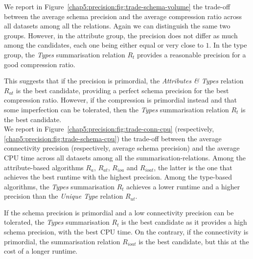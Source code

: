 We report in Figure~\ref{chap5:precision:fig:trade-schema-volume} the trade-off between the average schema precision and the average compression ratio across all datasets among all the relations. Again we can distinguish the same two groups. However, in the attribute group, the precision does not differ as much among the candidates, each one being either equal or very close to $1$. In the type group, the \emph{Types} summarisation relation $R_t$ provides a reasonable precision for a good compression ratio.

This suggests that if the precision is primordial, the \emph{Attributes \& Types} relation $R_{at}$ is the best candidate, providing a perfect schema precision for the best compression ratio. However, if the compression is primordial instead and that some imperfection can be tolerated, then the \emph{Types} summarisation relation $R_t$ is the best candidate.\\

We report in Figure~\ref{chap5:precision:fig:trade-conn-cpu} (respectively, \ref{chap5:precision:fig:trade-schema-cpu}) the trade-off between the average connectivity precision (respectively, average schema precision) and the average CPU time across all datasets among all the \glspl{summarisation-relation}. Among the attribute-based algorithms $R_a$, $R_{at}$, $R_{ioa}$ and $R_{ioat}$, the latter is the one that achieves the best runtime with the highest precision. Among the type-based algorithms, the \emph{Types} summarisation $R_t$ achieves a lower runtime and a higher precision than the \emph{Unique Type} relation $R_{ut}$.

If the schema precision is primordial and a low connectivity precision can be tolerated, the \emph{Types} summarisation $R_t$ is the best candidate as it provides a high schema precision, with the best CPU time. On the contrary, if the connectivity is primordial, the summarisation relation $R_{ioat}$ is the best candidate, but this at the cost of a longer runtime.

